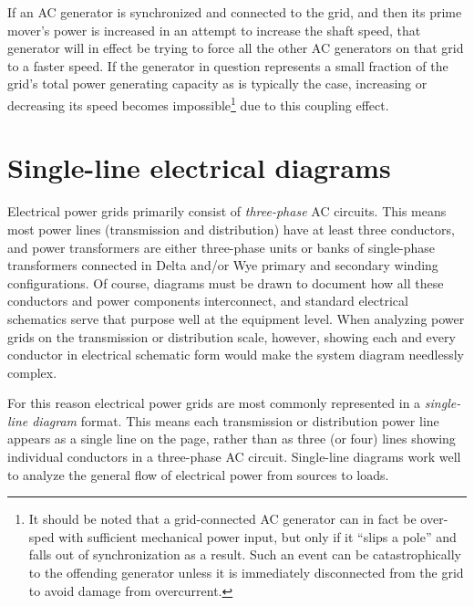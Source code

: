 If an AC generator is synchronized and connected to the grid, and then its prime mover's power is increased in an attempt to increase the shaft speed, that generator will in effect be trying to force all the other AC generators on that grid to a faster speed.  If the generator in question represents a small fraction of the grid's total power generating capacity as is typically the case, increasing or decreasing its speed becomes impossible\footnote{It should be noted that a grid-connected AC generator can in fact be over-sped with sufficient mechanical power input, but only if it ``slips a pole'' and falls out of synchronization as a result.  Such an event can be catastrophically to the offending generator unless it is immediately disconnected from the grid to avoid damage from overcurrent.} due to this coupling effect.  











\filbreak
\section{Single-line electrical diagrams}

Electrical power grids primarily consist of \textit{three-phase} AC circuits.  This means most power lines (transmission and distribution) have at least three conductors, and power transformers are either three-phase units or banks of single-phase transformers connected in Delta and/or Wye primary and secondary winding configurations.  Of course, diagrams must be drawn to document how all these conductors and power components interconnect, and standard electrical schematics serve that purpose well at the equipment level.  When analyzing power grids on the transmission or distribution scale, however, showing each and every conductor in electrical schematic form would make the system diagram needlessly complex.

For this reason electrical power grids are most commonly represented in a \textit{single-line diagram} format.  This means each transmission or distribution power line appears as a single line on the page, rather than as three (or four) lines showing individual conductors in a three-phase AC circuit.  Single-line diagrams work well to analyze the general flow of electrical power from sources to loads.

\vskip 10pt

\filbreak

